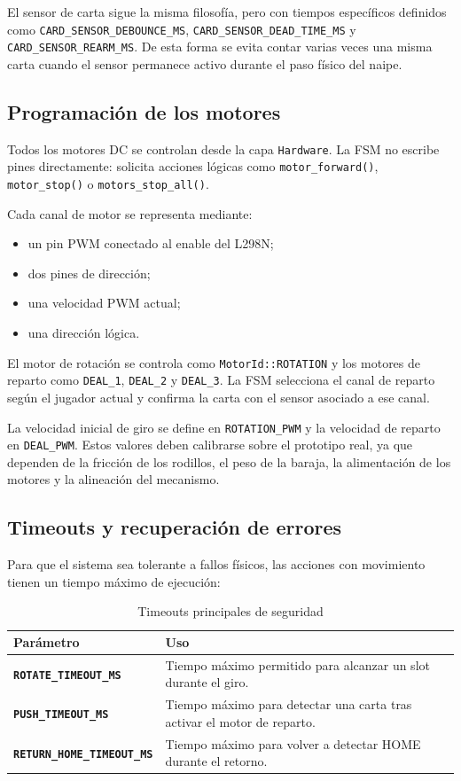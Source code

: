 El sensor de carta sigue la misma filosofía, pero con tiempos específicos definidos como \texttt{CARD\_SENSOR\_DEBOUNCE\_MS}, \texttt{CARD\_SENSOR\_DEAD\_TIME\_MS} y \texttt{CARD\_SENSOR\_REARM\_MS}. De esta forma se evita contar varias veces una misma carta cuando el sensor permanece activo durante el paso físico del naipe.

\subsection{Programación de los motores}

Todos los motores DC se controlan desde la capa \texttt{Hardware}. La FSM no escribe pines directamente: solicita acciones lógicas como \texttt{motor\_forward()}, \texttt{motor\_stop()} o \texttt{motors\_stop\_all()}.

Cada canal de motor se representa mediante:

\begin{itemize}
    \item un pin PWM conectado al enable del L298N;
    \item dos pines de dirección;
    \item una velocidad PWM actual;
    \item una dirección lógica.
\end{itemize}

El motor de rotación se controla como \texttt{MotorId::ROTATION} y los motores de reparto como \texttt{DEAL\_1}, \texttt{DEAL\_2} y \texttt{DEAL\_3}. La FSM selecciona el canal de reparto según el jugador actual y confirma la carta con el sensor asociado a ese canal.

La velocidad inicial de giro se define en \texttt{ROTATION\_PWM} y la velocidad de reparto en \texttt{DEAL\_PWM}. Estos valores deben calibrarse sobre el prototipo real, ya que dependen de la fricción de los rodillos, el peso de la baraja, la alimentación de los motores y la alineación del mecanismo.

\subsection{Timeouts y recuperación de errores}

Para que el sistema sea tolerante a fallos físicos, las acciones con movimiento tienen un tiempo máximo de ejecución:

\begin{table}[H]
\centering
\small
\begin{tabularx}{\textwidth}{>{\bfseries}p{}X}
\hline
\textbf{Parámetro} & \textbf{Uso} \\
\hline
\texttt{ROTATE\_TIMEOUT\_MS} & Tiempo máximo permitido para alcanzar un slot durante el giro. \\
\texttt{PUSH\_TIMEOUT\_MS} & Tiempo máximo para detectar una carta tras activar el motor de reparto. \\
\texttt{RETURN\_HOME\_TIMEOUT\_MS} & Tiempo máximo para volver a detectar HOME durante el retorno. \\
\hline
\end{tabularx}
\caption{Timeouts principales de seguridad}
\label{tab:timeouts}
\end{table}

